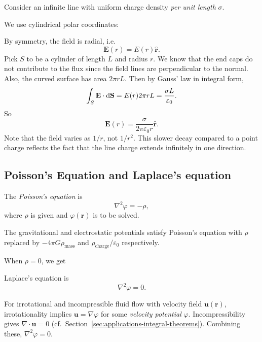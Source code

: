 \documentclass[a4paper]{article}
\begin{document}
\begin{eg}
  Consider an infinite line with uniform charge density \emph{per unit length} $\sigma$.

  We use cylindrical polar coordinates:
  \begin{center}
  \end{center}
  By symmetry, the field is radial, i.e.
  \[
    \mathbf{E}(r) = E(r) \hat{\mathbf{r}}.
  \]
  Pick $S$ to be a cylinder of length $L$ and radius $r$. We know that the end caps do not contribute to the flux since the field lines are perpendicular to the normal. Also, the curved surface has area $2\pi r L$. Then by Gauss' law in integral form,
  \[
    \int_S\mathbf{E}\cdot \mathrm{d} \mathbf{S} = E(r)2\pi rL = \frac{\sigma L}{\varepsilon_0}.
  \]
  So
  \[
    \mathbf{E}(r) = \frac{\sigma}{2\pi \varepsilon_0 r} \hat{\mathbf{r}}.
  \]
  Note that the field varies as $1/r$, not $1/r^2$. This slower decay compared to a point charge reflects the fact that the line charge extends infinitely in one direction.
\end{eg}

\subsection{Poisson's Equation and Laplace's equation}
\begin{defi}
  The \emph{Poisson's equation} is
  \[
    \nabla^2 \varphi = -\rho,
  \]
  where $\rho$ is given and $\varphi(\mathbf{r})$ is to be solved.
\end{defi}
\begin{rmk}
  The gravitational and electrostatic potentials satisfy Poisson's equation with $\rho$ replaced by $-4\pi G\rho_{\mathrm{mass}}$ and $\rho_{\mathrm{charge}}/\varepsilon_0$ respectively.
\end{rmk}

When $\rho = 0$, we get
\begin{defi}
  Laplace's equation is
  \[
    \nabla^2 \varphi = 0.
  \]
\end{defi}
\begin{eg}
  For irrotational and incompressible fluid flow with velocity field $\mathbf{u}(\mathbf{r})$, irrotationality implies $\mathbf{u} = \nabla \varphi$ for some \emph{velocity potential} $\varphi$. Incompressibility gives $\nabla\cdot \mathbf{u} = 0$ (cf.\ Section~\ref{sec:applications-integral-theorems}). Combining these, $\nabla^2 \varphi = 0$.
\end{eg}
\end{document}
